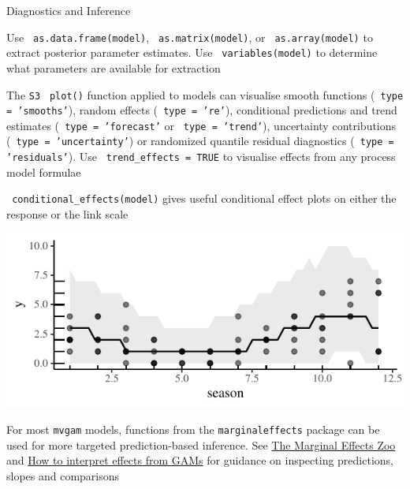 \documentclass[final,9pt,fleqn]{beamer}\usepackage[]{graphicx}\usepackage[]{xcolor}
\makeatletter
\def\maxwidth{ %
  \ifdim\Gin@nat@width>\linewidth
    \linewidth
  \else
    \Gin@nat@width
  \fi
}
\newenvironment{knitrout}{}{} %
\makeatother
\begin{document}
\begin{frame}[fragile]
\begin{columns}
\begin{column}{0.3\paperwidth}
\begin{block}{{\fontsize{21}{21} \selectfont \color{BrickRed} Diagnostics and Inference}}
\begin{knitrout}
\end{knitrout}

\medskip
Use \texttt{\color{Orchid} as.data.frame(model)}, \texttt{\color{Orchid} as.matrix(model)}, or \texttt{\color{Orchid} as.array(model)} to extract posterior parameter estimates. Use \texttt{\color{Orchid} variables(model)} to determine what parameters are available for extraction

\medskip
The \texttt{S3} \texttt{\color{Orchid} plot()} function applied to models can visualise smooth functions (\texttt{\color{Orchid} type = 'smooths'}), random effects (\texttt{\color{Orchid} type = 're'}), conditional predictions and trend estimates (\texttt{\color{Orchid} type = 'forecast'} or \texttt{\color{Orchid} type = 'trend'}), uncertainty contributions (\texttt{\color{Orchid} type = 'uncertainty'}) or randomized quantile residual diagnostics (\texttt{\color{Orchid} type = 'residuals'}). Use \texttt{\color{Orchid} trend\_effects = TRUE} to visualise effects from any process model formulae

\medskip
\texttt{\color{Orchid} conditional\_effects(model)} gives useful conditional effect plots on either the response or the link scale

\smallskip
\begin{knitrout}
\color{fgcolor}

{\centering \includegraphics[width=\maxwidth]{figure/unnamed-chunk-5-1} 

}


\end{knitrout}

For most \texttt{mvgam} models, functions from the \texttt{marginaleffects} package can be used for more targeted prediction-based inference. See \href{https://marginaleffects.com/}{The Marginal Effects Zoo} and \href{https://ecogambler.netlify.app/blog/interpreting-gams/}{How to interpret effects from GAMs} for guidance on inspecting predictions, slopes and comparisons
\begin{knitrout}
\color{fgcolor}


\end{knitrout}
\end{block}
\end{column}
\end{columns}
\end{frame}
\end{document}
